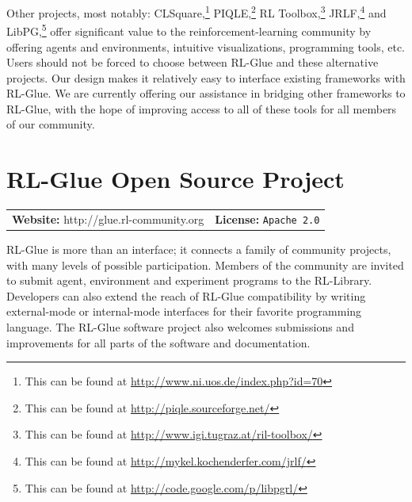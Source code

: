 \documentclass[twoside,11pt]{article}
\begin{document}
Other projects, most notably: CLSquare,\footnote{This can be found at \url{http://www.ni.uos.de/index.php?id=70}}  PIQLE,\footnote{This can be found at \url{http://piqle.sourceforge.net/}} RL Toolbox,\footnote{This can be found at \url{http://www.igi.tugraz.at/ril-toolbox/}} JRLF,\footnote{This can be found at \url{http://mykel.kochenderfer.com/jrlf/}}  and LibPG,\footnote{This can be found at \url{http://code.google.com/p/libpgrl/}} offer significant value to the reinforcement-learning community by offering agents and environments, intuitive visualizations, programming tools, etc.  Users should not be forced to choose between RL-Glue and these alternative projects. Our design makes it relatively easy to interface existing frameworks with RL-Glue.  We are currently offering our assistance in bridging other frameworks to RL-Glue, with the hope of improving access to all of these tools for all members of our community.

 
\section{RL-Glue Open Source Project}
\begin{tabular}{ l l}
  \textbf{Website:} http://glue.rl-community.org  & \textbf{License:} \texttt{Apache 2.0}  \end{tabular}

RL-Glue is more than an interface; it connects a family of community projects, with many levels of possible participation. Members of the community are invited to submit agent, environment and experiment programs to the RL-Library. Developers can also extend the reach of RL-Glue compatibility by writing external-mode or internal-mode interfaces for their favorite programming language.  The RL-Glue software project also welcomes submissions and improvements for all parts of the software and documentation.  


%
%




\end{document}
